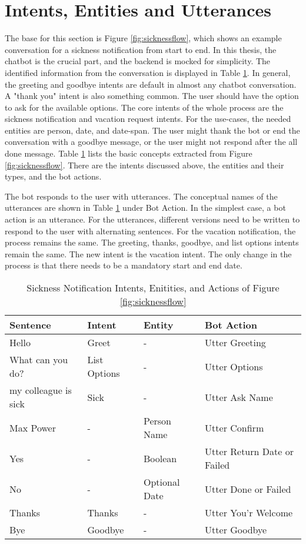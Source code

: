  \section{Intents, Entities and Utterances}
The base for this section is Figure \ref{fig:sicknessflow}, which shows an example conversation for a sickness notification from start to end.
 In this thesis, the chatbot is the crucial part, and the backend is mocked for simplicity.
 The identified information from the conversation is displayed in Table \ref{tab:sick_data}.
 In general, the greeting and goodbye intents are default in almost any chatbot conversation.
 A "thank you" intent is also something common.
 The user should have the option to ask for the available options.
 The core intents of the whole process are the sickness notification and vacation request intents.
 For the use-cases, the needed entities are person, date, and date-span.
 The user might thank the bot or end the conversation with a goodbye message, or the user might not respond after the all done message.
Table \ref{tab:sick_data} lists the basic concepts extracted from Figure \ref{fig:sicknessflow}.
 There are the intents discussed above, the entities and their types, and the bot actions.


 The bot responds to the user with utterances.
 The conceptual names of the utterances are shown in Table \ref{tab:sick_data} under Bot Action.
 In the simplest case, a bot action is an utterance.
 For the utterances, different versions need to be written to respond to the user with alternating sentences.
 For the vacation notification, the process remains the same.
 The greeting, thanks, goodbye, and list options intents remain the same.
 The new intent is the vacation intent.
 The only change in the process is that there needs to be a mandatory start and end date.

 \begin{table}[h]
    \centering
    \begin{tabular}{ l | l | l | l }
        Sentence & Intent & Entity & Bot Action \\ \hline \hline
        Hello & Greet & - & Utter Greeting \\ \hline
        What can you do? & List Options & - & Utter Options \\ \hline
        my colleague is sick & Sick & - & Utter Ask Name \\ \hline
        Max Power & - & Person Name & Utter Confirm \\ \hline
        Yes & - & Boolean & Utter Return Date or Failed \\ \hline
        No & - & Optional Date & Utter Done or Failed \\ \hline
        Thanks & Thanks & - & Utter You'r Welcome \\ \hline
        Bye & Goodbye & - & Utter Goodbye 
    \end{tabular}
    \caption{Sickness Notification Intents, Enitities, and Actions of Figure \ref{fig:sicknessflow}} \label{tab:sick_data}
\end{table} \noindent

